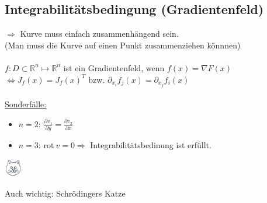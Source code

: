 \documentclass[6pt,a4paper]{scrartcl}
\newcommand{\Ra}[0]{\ensuremath{\Rightarrow}}									%
\newcommand{\rot}{\ensuremath{\mathrm{rot}\ }}									%
\newcommand{\R}{\ensuremath{\mathbb R}}
\begin{document}
\begin{multicols}{4}
\subsection{Integrabilitätsbedingung (Gradientenfeld)} %
$\Ra$ Kurve muss einfach zusammenhängend sein. \\
(Man muss die Kurve auf einen Punkt zusammenziehen könnnen) \\ \\
$f:D \subset \R^n \mapsto \R^n$ ist ein Gradientenfeld, wenn $f(x) = \nabla{F(x)}$ \\
$\Leftrightarrow \boxed{J_f(x) = J_f(x)^T}$ bzw. $\partial_{x_i}f_j(x) = \partial_{x_j}f_i(x)$ \\ \\
\underline{Sonderfälle:}
\begin{itemize} \itemsep0pt
	\item $n = 2$: $\frac{\partial v_1}{\partial y} = \frac{\partial v_2}{\partial x}$
	\item $n = 3$: $\rot v = 0 \Ra $ Integrabilitätsbedinung ist erfüllt.
\end{itemize}


\parbox{2.0cm}{
\includegraphics[height=0.8cm]{./img/cat.jpg}
}
\parbox{4.0cm}{
	Auch wichtig: Schrödingers Katze
}

\end{multicols}

\end{document}
